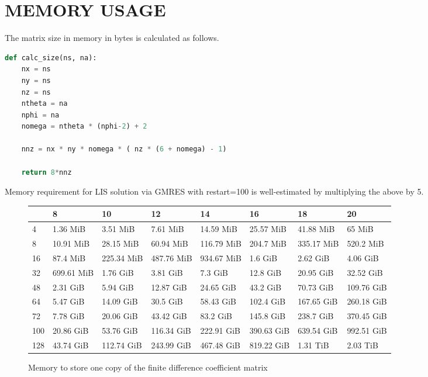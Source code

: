 \chapter{MEMORY USAGE}
\label{chap:memory_usage}

The matrix size in memory in bytes is calculated as follows.
\begin{lstlisting}[language=Python]
def calc_size(ns, na):
    nx = ns
    ny = ns
    nz = ns
    ntheta = na
    nphi = na
    nomega = ntheta * (nphi-2) + 2

    nnz = nx * ny * nomega * ( nz * (6 + nomega) - 1)

    return 8*nnz
\end{lstlisting}

Memory requirement for LIS solution via GMRES with restart=100 is well-estimated by multiplying the above by 5.

\begin{sidewaysfigure}
  \centering
  \caption{Memory to store one copy of the finite difference coefficient matrix}
  \begin{tabular}{llllllll}
  \toprule
  {} &          8  &          10 &          12 &          14 &          16 &          18 &          20 \\
  \midrule
  4   &    1.36 MiB &    3.51 MiB &    7.61 MiB &   14.59 MiB &   25.57 MiB &   41.88 MiB &      65 MiB \\
  8   &   10.91 MiB &   28.15 MiB &   60.94 MiB &  116.79 MiB &   204.7 MiB &  335.17 MiB &   520.2 MiB \\
  16  &    87.4 MiB &  225.34 MiB &  487.76 MiB &  934.67 MiB &     1.6 GiB &    2.62 GiB &    4.06 GiB \\
  32  &  699.61 MiB &    1.76 GiB &    3.81 GiB &     7.3 GiB &    12.8 GiB &   20.95 GiB &   32.52 GiB \\
  48  &    2.31 GiB &    5.94 GiB &   12.87 GiB &   24.65 GiB &    43.2 GiB &   70.73 GiB &  109.76 GiB \\
  64  &    5.47 GiB &   14.09 GiB &    30.5 GiB &   58.43 GiB &   102.4 GiB &  167.65 GiB &  260.18 GiB \\
  72  &    7.78 GiB &   20.06 GiB &   43.42 GiB &    83.2 GiB &   145.8 GiB &   238.7 GiB &  370.45 GiB \\
  100 &   20.86 GiB &   53.76 GiB &  116.34 GiB &  222.91 GiB &  390.63 GiB &  639.54 GiB &  992.51 GiB \\
  128 &   43.74 GiB &  112.74 GiB &  243.99 GiB &  467.48 GiB &  819.22 GiB &    1.31 TiB &    2.03 TiB \\
  \bottomrule
  \end{tabular}
\end{sidewaysfigure}

